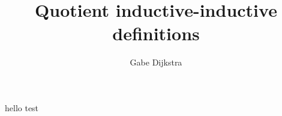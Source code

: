 

\title{Quotient inductive-inductive definitions}
\author{Gabe Dijkstra}



\maketitle

hello test~\cite{Univalent2013}

\appendix



